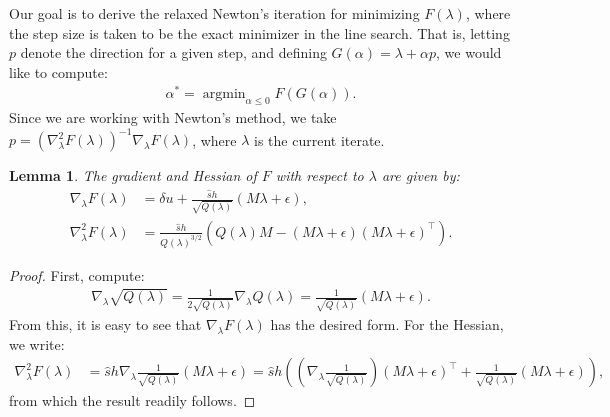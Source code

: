 \documentclass{article}
\newcommand{\parens}[1]{\left(#1\right)}
\newtheorem{lemma}{Lemma}
\DeclareMathOperator{\argmin}{argmin}
\begin{document}
Our goal is to derive the relaxed Newton's iteration for minimizing
$F(\lambda)$, where the step size is taken to be the exact minimizer
in the line search. That is, letting $p$ denote the direction for a
given step, and defining $G(\alpha) = \lambda + \alpha p$, we would
like to compute:
\begin{align*}
  \alpha^* = \argmin_{\alpha \leq 0} F(G(\alpha)).
\end{align*}
Since we are working with Newton's method, we take
$p = {(\nabla_\lambda^2F(\lambda))}^{-1} \nabla_\lambda F(\lambda)$,
where $\lambda$ is the current iterate.

\begin{lemma}
  The gradient and Hessian of $F$ with respect to $\lambda$ are given
  by:
  \begin{align*}
    \nabla_\lambda F(\lambda) &= \delta u + \frac{\hat{s} h}{\sqrt{Q(\lambda)}} {(M\lambda + \epsilon)}, \\
    \nabla_\lambda^2 F(\lambda) &= \frac{\hat{s}h}{Q(\lambda)^{3/2}} \parens{Q(\lambda) M - {(M\lambda + \epsilon)}{(M\lambda + \epsilon)}^\top}.
  \end{align*}
\end{lemma}

\begin{proof}
  First, compute:
  \begin{align*}
    \nabla_\lambda \sqrt{Q(\lambda)} = \frac{1}{2 \sqrt{Q(\lambda)}} \nabla_\lambda Q(\lambda) = \frac{1}{\sqrt{Q(\lambda)}}\parens{M\lambda + \epsilon}.
  \end{align*}
  From this, it is easy to see that $\nabla_\lambda F(\lambda)$ has
  the desired form. For the Hessian, we write:
  \begin{align*}
    \nabla_\lambda^2 F(\lambda)
    &= \hat{s}h \nabla_\lambda \frac{1}{\sqrt{Q(\lambda)}}{(M\lambda + \epsilon)} = \hat{s}h \parens{\parens{\nabla_\lambda \frac{1}{\sqrt{Q(\lambda)}}} {(M\lambda + \epsilon)}^\top + \frac{1}{\sqrt{Q(\lambda)}} {(M\lambda + \epsilon)}},
  \end{align*}
  from which the result readily follows.
\end{proof}
\end{document}
